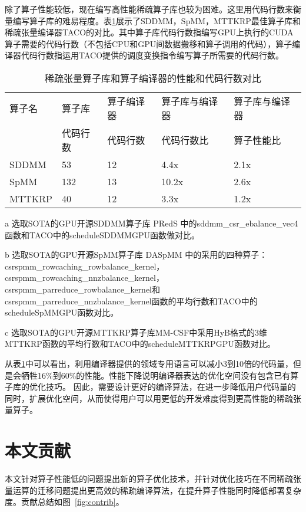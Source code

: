 除了算子性能较低，现在编写高性能稀疏算子库也较为困难。这里用代码行数来衡量编写算子库的难易程度。表\ref{tab:motivation-2}展示了SDDMM，SpMM，MTTKRP最佳算子库和稀疏张量编译器TACO的对比。其中算子库代码行数指编写GPU上执行的CUDA算子需要的代码行数（不包括CPU和GPU间数据搬移和算子调用的代码），算子编译器代码行数指运用TACO提供的调度变换指令编写算子所需要的代码行数。
\begin{table}
  \centering
  \begin{threeparttable}[c]
  \caption{稀疏张量算子库和算子编译器的性能和代码行数对比}
  \label{tab:motivation-2}
  \begin{tabular}{lllll}
    \toprule
    算子名  & 算子库 & 算子编译器 & 算子库与编译器 & 算子库与编译器   \\
           & 代码行数 & 代码行数 & 代码行数比    & 算子性能比       \\
    \midrule
    SDDMM\tnote{a}  & 53 & 12 & 4.4x & 2.1x \\
    SpMM\tnote{b}   & 132 & 13 & 10.2x & 2.6x \\
    MTTKRP\tnote{c} & 40 & 12 & 3.3x & 1.2x \\
    \bottomrule
  \end{tabular}
  \begin{tablenotes}
    \item [a] 选取SOTA的GPU开源SDDMM算子库 PRedS \cite{yu2021exploiting}中的sddmm\_csr\_ebalance\_vec4函数和TACO中的scheduleSDDMMGPU函数做对比。
    \item [b] 选取SOTA的GPU开源SpMM算子库 DASpMM \cite{dai2022heuristic}中的采用的四种算子：csrspmm\_rowcaching\_rowbalance\_kernel，
      csrspmm\_rowcaching\_nnzbalance\_kernel，csrspmm\_parreduce\_rowbalance\_kernel和csrspmm\_parreduce\_nnzbalance\_kernel函数的平均行数和TACO中的scheduleSpMMGPU函数对比。
    \item [c] 选取SOTA的GPU开源MTTKRP算子库MM-CSF\cite{nisa2019mttkrp}中采用HyB格式的3维MTTKRP函数的平均行数和TACO中的scheduleMTTKRPGPU函数对比。
  \end{tablenotes}
  \end{threeparttable}
\end{table}
从表\ref{tab:motivation-2}中可以看出，利用编译器提供的领域专用语言可以减小3到10倍的代码量，但是会牺牲16\%到60\%的性能。性能下降说明编译器表达的优化空间没有包含已有算子库的优化技巧。
因此，需要设计更好的编译算法，在进一步降低用户代码量的同时，扩展优化空间，从而使得用户可以用更低的开发难度得到更高性能的稀疏张量算子。

\section{本文贡献}
本文针对算子性能低的问题提出新的算子优化技术，并针对优化技巧在不同稀疏张量运算的迁移问题提出更高效的稀疏编译算法，在提升算子性能同时降低部署复杂度。贡献总结如图~\ref{fig:contrib}。

